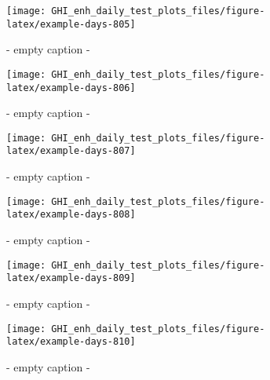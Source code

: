 \documentclass[
  10pt,
  a4paper,oneside]{article}
\begin{document}
\begin{figure}[H]

{\centering \texttt{[image: GHI\_enh\_daily\_test\_plots\_files/figure-latex/example-days-805]} 

}

\caption{ - empty caption - }\label{fig:example-days-805}
\end{figure}

\begin{figure}[H]

{\centering \texttt{[image: GHI\_enh\_daily\_test\_plots\_files/figure-latex/example-days-806]} 

}

\caption{ - empty caption - }\label{fig:example-days-806}
\end{figure}

\begin{figure}[H]

{\centering \texttt{[image: GHI\_enh\_daily\_test\_plots\_files/figure-latex/example-days-807]} 

}

\caption{ - empty caption - }\label{fig:example-days-807}
\end{figure}

\begin{figure}[H]

{\centering \texttt{[image: GHI\_enh\_daily\_test\_plots\_files/figure-latex/example-days-808]} 

}

\caption{ - empty caption - }\label{fig:example-days-808}
\end{figure}

\begin{figure}[H]

{\centering \texttt{[image: GHI\_enh\_daily\_test\_plots\_files/figure-latex/example-days-809]} 

}

\caption{ - empty caption - }\label{fig:example-days-809}
\end{figure}

\begin{figure}[H]

{\centering \texttt{[image: GHI\_enh\_daily\_test\_plots\_files/figure-latex/example-days-810]} 

}

\caption{ - empty caption - }\label{fig:example-days-810}
\end{figure}
\end{document}
